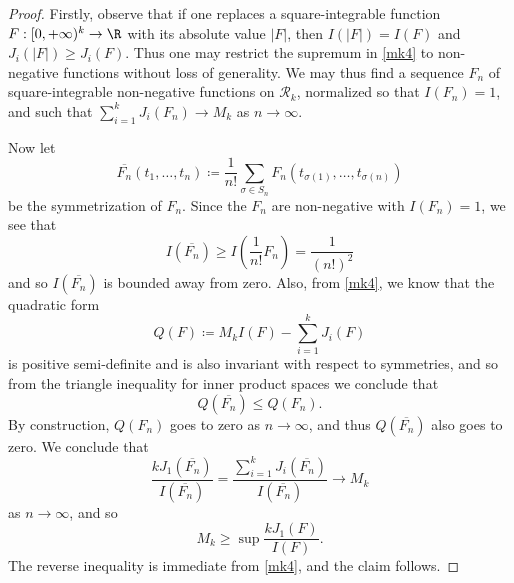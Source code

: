 \begin{proof}  Firstly, observe that if one replaces a square-integrable function $F: [0,+\infty)^k \to \R$ with its absolute value $|F|$, then $I(|F|) = I(F)$ and $J_i(|F|) \geq J_i(F)$.  Thus one may restrict the supremum in \eqref{mk4} to non-negative functions without loss of generality.  We may thus find a sequence $F_n$ of square-integrable non-negative functions on ${\mathcal R}_k$, normalized so that $I(F_n)=1$, and such that $\sum_{i=1}^k J_i(F_n) \to M_k$ as $n \to \infty$.

Now let 
$$\overline{F_n}(t_1,\dots,t_n) \coloneqq \frac{1}{n!} \sum_{\sigma \in S_n} F_n( t_{\sigma(1)},\dots,t_{\sigma(n)} )$$
be the symmetrization of $F_n$.  Since the $F_n$ are non-negative with $I(F_n)=1$, we see that
$$ I( \overline{F_n} ) \geq I( \frac{1}{n!} F_n ) = \frac{1}{(n!)^2}$$
and so $I(\overline{F_n})$ is bounded away from zero.  Also, from \eqref{mk4}, we know that the quadratic form
$$ Q(F) \coloneqq M_k I(F) - \sum_{i=1}^k J_i(F)$$
is positive semi-definite and is also invariant with respect to symmetries, and so from the triangle inequality for inner product spaces we conclude that
$$ Q( \overline{F_n} ) \leq Q( F_n ).$$
By construction, $Q(F_n)$ goes to zero as $n \to \infty$, and thus $Q(\overline{F_n})$ also goes to zero.  We conclude that 
$$ \frac{k J_1(\overline{F_n})}{I(\overline{F_n})} = \frac{\sum_{i=1}^k J_i(\overline{F_n})}{I(\overline{F_n})} \to M_k$$
as $n \to \infty$, and so
$$ M_k \geq \sup \frac{k J_1(F)}{I(F)}.$$
The reverse inequality is immediate from \eqref{mk4}, and the claim follows.
\end{proof}

